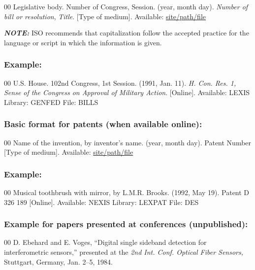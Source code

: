 \documentclass{IEEEoj-data}
\begin{document}
{\begin{thebibliography}{00}
 Legislative body. Number of Congress, Session. (year, month day). \textit{Number of bill or resolution}, \textit{Title}. [Type
of medium]. Available: \underline{site/path/file}
\end{thebibliography}

{\bfseries\itshape NOTE:} ISO recommends that capitalization follow the
accepted practice for the language or script in which the information is
given.

\subsubsection*{Example:}

\begin{thebibliography}{00}
 U.S. House. 102nd Congress, 1st Session. (1991, Jan. 11). \textit{H. Con. Res. 1, Sense of the Congress on Approval of Military Action}. [Online]. Available: LEXIS Library: GENFED File: BILLS
\end{thebibliography}

\subsubsection*{Basic format for patents (when available online):}

\begin{thebibliography}{00}
 Name of the invention, by inventor's name. (year, month day). Patent Number [Type
of medium]. Available: \underline{site/path/file}
\end{thebibliography}

\subsubsection*{Example:}

\begin{thebibliography}{00}
 Musical toothbrush with mirror, by L.M.R. Brooks. (1992, May 19). Patent D 326 189 [Online]. Available: NEXIS Library: LEXPAT File: DES
\end{thebibliography}

\subsubsection*{Example for papers presented at conferences (unpublished):}

\begin{thebibliography}{00}
 D. Ebehard and E. Voges, ``Digital single sideband
detection for interferometric sensors,'' presented at the \textit{2nd Int. Conf. Optical Fiber Sensors,} Stuttgart, Germany, Jan. 2--5, 1984.
\end{thebibliography}

}
\end{document}
